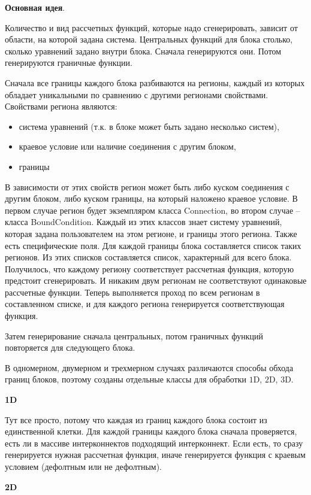 \documentclass[a4paper]{article}
\begin{document}
{\bf Основная идея}.

Количество и вид рассчетных функций, которые надо сгенерировать, зависит от области, на которой задана система. Центральных функций для блока столько, сколько уравнений задано внутри блока. Сначала генерируются они. Потом ге\-не\-ри\-ру\-ют\-ся граничные функции.

Сначала все границы каждого блока разбиваются на регионы, каждый из которых обладает уникальными по сравнению с другими регионами свойствами. Свойствами региона являются:
\begin{itemize}
\item система уравнений (т.к. в блоке может быть задано несколько систем),
\item краевое условие или наличие соединения с другим блоком,
\item границы
\end{itemize}
В зависимости от этих свойств регион может быть либо куском соединения с другим блоком, либо куском границы, на который наложено краевое условие. В первом случае регион будет экземпляром класса Connection, во втором случае -- класса BoundCondition. Каждый из этих классов знает систему уравнений, которая задана пользователем на этом регионе, и границы этого региона. Также есть специфические поля. Для каждой границы блока составляется список таких регионов. Из этих списков составляется список, характерный для всего блока. Получилось, что каждому региону соответствует рассчетная функция, которую предстоит сгенерировать. И никаким двум регионам не соответствуют одинаковые рассчетные функции. Теперь выполняется проход по всем регионам в составленном списке, и для каждого региона генерируется соответствующая функция.

Затем генерирование сначала центральных, потом граничных функций по\-вто\-ря\-ет\-ся для следующего блока.

В одномерном, двумерном и трехмерном случаях различаются способы обхода границ блоков, поэтому созданы отдельные классы для обработки $1$D, $2$D, $3$D.

{\bf 1D}

Тут все просто, потому что каждая из границ каждого блока состоит из един\-ствен\-ной клетки. Для каждой границы каждого блока сначала проверяется, есть ли в массиве интерконнектов подходящий интерконнект. Если есть, то сразу генерируется нужная рассчетная функция, иначе генерируется функция с краевым условием (де\-фолт\-ным или не дефолтным).

{\bf 2D}
\end{document}
